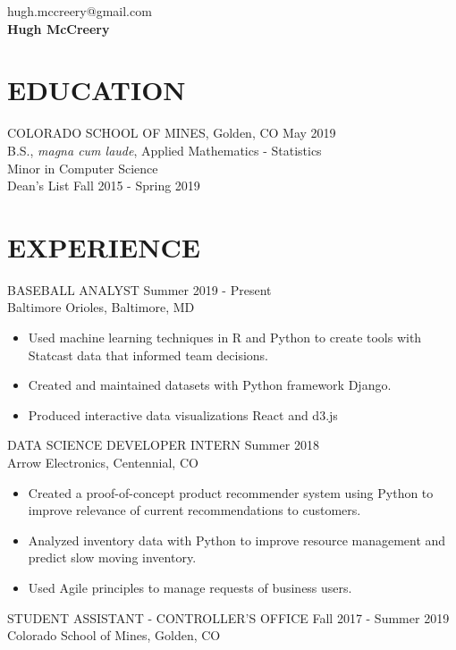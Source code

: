 \documentclass[11pt]{res} %
\begin{document}
 
\begin{multicols}{3}
\noindent \raggedright{hugh.mccreery@gmail.com}\\ \textbf{\LARGE Hugh McCreery}\\ 
\end{multicols}
\vspace{-0.4in}
\begin{resume}
\vspace{-0.2in}
\hrulefill
\vspace{-0.2in}                                  
\section{EDUCATION} 
 \noindent COLORADO SCHOOL OF MINES, Golden, CO \hfill May 2019 \\
B.S., \textit{magna cum laude}, Applied Mathematics - Statistics\\
Minor in Computer Science \\
Dean's List \hfill Fall 2015 - Spring 2019 \\
\vspace{-0.1in}
\hrulefill
\vspace{-0.1in}  
\section{EXPERIENCE} 
BASEBALL ANALYST \hfill Summer 2019 - Present	\\
Baltimore Orioles, Baltimore, MD

\begin{itemize}
	\item Used machine learning techniques in R and Python to create tools with Statcast data that informed team decisions.
	\item Created and maintained datasets with Python framework Django.
	\item Produced interactive data visualizations React and d3.js
\end{itemize}
\vspace{-0.15in}  
DATA SCIENCE DEVELOPER INTERN \hfill Summer 2018 \\
Arrow Electronics, Centennial, CO

\begin{itemize}
	\item Created a proof-of-concept product recommender system using Python to improve relevance of current recommendations to customers.
	\item Analyzed inventory data with Python to improve resource management and predict slow moving inventory.
	\item Used Agile principles to manage requests of business users.
\end{itemize}
\vspace{-0.15in}  
STUDENT ASSISTANT - CONTROLLER'S OFFICE \hfill Fall 2017 - Summer 2019 \\
Colorado School of Mines, Golden, CO 


\end{resume}
\end{document}
